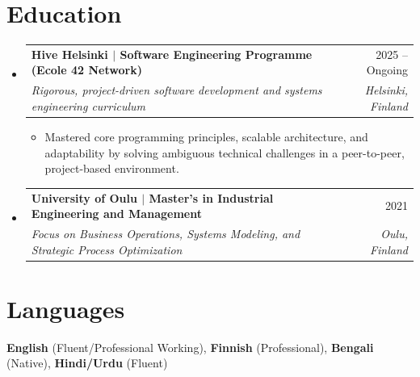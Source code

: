 \documentclass[a4paper,11pt]{article}
\makeatletter
\newcommand{\resumeItem}[1]{
  \item\small{{#1}}
}
\newcommand{\resumeSubheading}[4]{
  \vspace{-1pt}\item
    \begin{tabular*}{0.97\textwidth}[t]{l@{\extracolsep{\fill}}r}
      \textbf{#1} & \small #2 \\
      \textit{\small#3} & \textit{\small #4} \\
    \end{tabular*}\vspace{-6pt}
}
\newcommand{\resumeSubHeadingListStart}{\begin{itemize}[leftmargin=0.15in, label={}]}
\newcommand{\resumeSubHeadingListEnd}{\end{itemize}\vspace{-6pt}}
\newcommand{\resumeItemListStart}{
  \begin{itemize}[leftmargin=0.2in, itemsep=0pt, parsep=0pt, topsep=1pt]
}
\newcommand{\resumeItemListEnd}{\end{itemize}\vspace{-2pt}}
\makeatother
\begin{document}
\vspace{-4pt}

\section{Education}
\resumeSubHeadingListStart
  \resumeSubheading
    {Hive Helsinki $|$ \normalfont Software Engineering Programme (Ecole 42 Network)}{2025 -- Ongoing}
    {Rigorous, project-driven software development and systems engineering curriculum}{Helsinki, Finland}
    \resumeItemListStart
        \resumeItem{Mastered core programming principles, scalable architecture, and adaptability by solving ambiguous technical challenges in a peer-to-peer, project-based environment.}
    \resumeItemListEnd

  \resumeSubheading
    {University of Oulu $|$ \normalfont Master's in Industrial Engineering and Management}{2021}
    {Focus on Business Operations, Systems Modeling, and Strategic Process Optimization}{Oulu, Finland}
\resumeSubHeadingListEnd

\vspace{-2pt}

\section{Languages}
\begin{itemize}[leftmargin=0.15in, label={}, itemsep=0pt, topsep=1pt]
\small{\item{
\textbf{English} (Fluent/Professional Working), \textbf{Finnish} (Professional), \textbf{Bengali} (Native), \textbf{Hindi/Urdu} (Fluent)
}}
\end{itemize}
\end{document}
